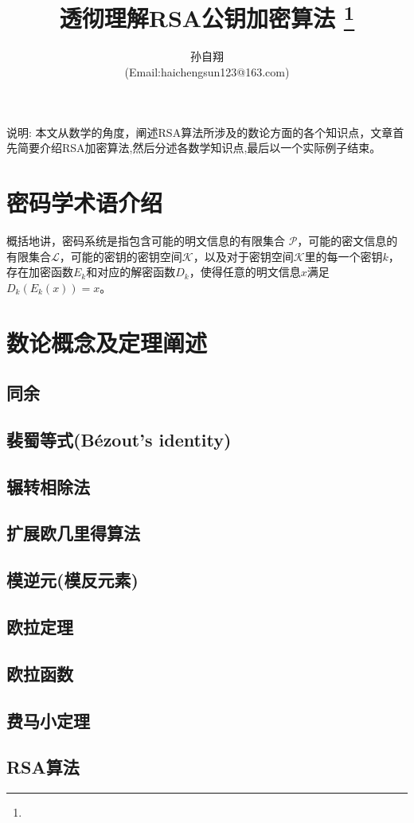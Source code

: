 \documentclass{article}
\title{\huge{透彻理解RSA公钥加密算法} \thanks{}}
\author{孙自翔\\[2pt]
(Email:haichengsun123@163.com) \\[2pt]}
\date{}  %
\begin{document}
\tableofcontents
{} %

\newpage

\maketitle

说明: 本文从数学的角度，阐述RSA算法所涉及的数论方面的各个知识点，文章首先简要介绍RSA加密算法,然后分述各数学知识点,最后以一个实际例子结束。
% 
\section{密码学术语介绍}
% 
\hspace*{6mm}
概括地讲\cite{BOOK:1}，密码系统是指包含可能的明文信息的有限集合 $\mathscr{P}$，可能的密文信息的有限集合$\mathscr{L}$，可能的密钥的密钥空间$\mathscr{K}$，以及对于密钥空间$\mathscr{K}$里的每一个密钥$k$，存在加密函数$E_k$和对应的解密函数$D_k$，使得任意的明文信息$x$满足$D_k(E_k(x))=x$。


\section{数论概念及定理阐述}
\subsection{同余}   
\subsection{裴蜀等式(Bézout's identity)}   
\subsection{辗转相除法}   
\subsection{扩展欧几里得算法}   
\subsection{模逆元(模反元素)}   
\subsection{欧拉定理}   
\subsection{欧拉函数}   
\subsection{费马小定理}   
\subsection{RSA算法}   
 

 

\end{document}
